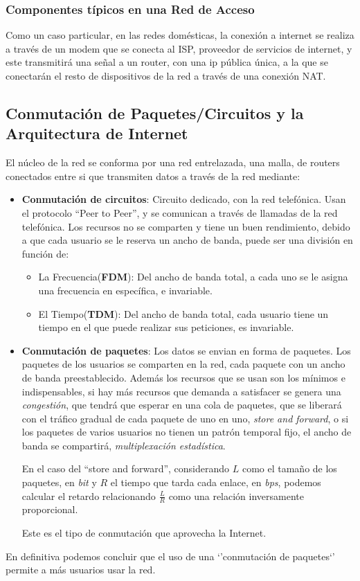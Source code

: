 \subsubsection{Componentes típicos en una Red de Acceso}
\noindent Como un caso particular, en las redes domésticas, la conexión a internet se realiza a través de un modem que se conecta al ISP, proveedor de servicios de internet, y este transmitirá una señal a un router, con una ip pública única, a la que se conectarán el resto de dispositivos de la red a través de una conexión NAT.
\subsection{Conmutación de Paquetes/Circuitos y la Arquitectura de Internet}
\noindent El núcleo de la red se conforma por una red entrelazada, una malla, de routers conectados entre si que transmiten datos a través de la red mediante:
\begin{itemize}
        \item \textbf{Conmutación de circuitos}: Circuito dedicado, con la red telefónica. Usan el protocolo ``Peer to Peer'', y se comunican a través de llamadas de la red telefónica. Los recursos no se comparten y tiene un buen rendimiento, debido a que cada usuario se le reserva un ancho de banda, puede ser una división en función de:
              \begin{itemize}
                      \item La Frecuencia(\textbf{FDM}): Del ancho de banda total, a cada uno se le asigna una frecuencia en específica, e invariable.
                      \item El Tiempo(\textbf{TDM}): Del ancho de banda total, cada usuario tiene un tiempo en el que puede realizar sus peticiones, es invariable.
              \end{itemize}
        \item \textbf{Conmutación de paquetes}: Los datos se envian en forma de paquetes. Los paquetes de los usuarios se comparten en la red, cada paquete con un ancho de banda preestablecido. Además los recursos que se usan son los mínimos e indispensables, si hay más recursos que demanda a satisfacer se genera una \textit{congestión}, que tendrá que esperar en una cola de paquetes, que se liberará con el tráfico gradual de cada paquete de uno en uno, \textit{store and forward}, o si los paquetes de varios usuarios no tienen un patrón temporal fijo, el ancho de banda se compartirá, \textit{multiplexación estadística}.\par \noindent En el caso del ``store and forward'', considerando \(L\) como el tamaño de los paquetes, en \textit{bit} y \(R\) el tiempo que tarda cada enlace, en \textit{bps}, podemos calcular el retardo relacionando \(\frac{L}{R}\) como una relación inversamente proporcional.\par \noindent Este es el tipo de conmutación que aprovecha la Internet.
\end{itemize}
\noindent En definitiva podemos concluir que el uso de una `'conmutación de paquetes`' permite a más usuarios usar la red.

